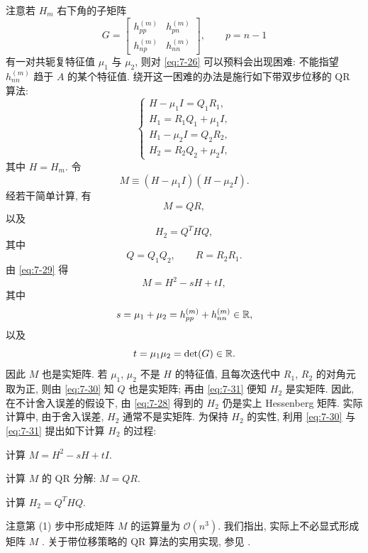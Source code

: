注意若 $H_m$ 右下角的子矩阵
\[
  G=\begin{bmatrix}
    h_{pp}^{(m)} & h_{pn}^{(m)}\\
    h_{np}^{(m)} & h_{nn}^{(m)}
  \end{bmatrix},
  \qquad p=n-1
\]
有一对共轭复特征值 $\mu_1$ 与 $\mu_2$, 则对 \eqref{eq:7-26} 可以预料会出现困难: 不能指望 $h_{nn}^{(m)}$ 趋于 $A$ 的某个特征值. 绕开这一困难的办法是施行如下带双步位移的 QR 算法:
\begin{equation}
  \left\{
  \begin{array}{l}
    H-\mu_1I=Q_1R_1,\\
    H_1=R_1Q_1+\mu_1I,\\
    H_1-\mu_2I=Q_2R_2,\\
    H_2=R_2Q_2+\mu_2I,
  \end{array}
  \right.
  \label{eq:7-28}
\end{equation}
其中 $H=H_m$. 令
\begin{equation}
  M\equiv(H-\mu_1I)(H-\mu_2I).
  \label{eq:7-29}
\end{equation}
经若干简单计算, 有
\begin{equation}
  M=QR,
  \label{eq:7-30}
\end{equation}
以及
\begin{equation}
  H_2=Q^THQ,
  \label{eq:7-31}
\end{equation}
其中
\[
  Q=Q_1Q_2,\qquad R=R_2R_1.
\]
由 \eqref{eq:7-29} 得
\[
  M=H^2-sH+tI,
\]
其中
\[
  s=\mu_1+\mu_2=h_{pp}^{(m)}+h_{nn}^{(m)}\in\mathbb{R},
\]
以及
\[
  t=\mu_1\mu_2=\det(G)\in\mathbb{R}.
\]
因此 $M$ 也是实矩阵. 若 $\mu_1$, $\mu_2$ 不是 $H$ 的特征值, 且每次迭代中 $R_1$, $R_2$ 的对角元取为正, 则由 \eqref{eq:7-30} 知 $Q$ 也是实矩阵; 再由 \eqref{eq:7-31} 便知 $H_2$ 是实矩阵. 因此, 在不计舍入误差的假设下, 由 \eqref{eq:7-28} 得到的 $H_2$ 仍是实上 Hessenberg 矩阵. 实际计算中, 由于舍入误差, $H_2$ 通常不是实矩阵. 为保持 $H_2$ 的实性, 利用 \eqref{eq:7-30} 与 \eqref{eq:7-31} 提出如下计算 $H_2$ 的过程:
\begin{parenlist}
  \item 计算 $M=H^2-sH+tI$.
  \item 计算 $M$ 的 QR 分解: $M=QR$.
  \item 计算 $H_2=Q^THQ$.
\end{parenlist}
注意第 (1) 步中形成矩阵 $M$ 的运算量为 $\mathcal{O}(n^3)$. 我们指出, 实际上不必显式形成矩阵 $M$ \cite{src:30}. 关于带位移策略的 QR 算法的实用实现, 参见 \cite{src:30,src:32,src:98}.

